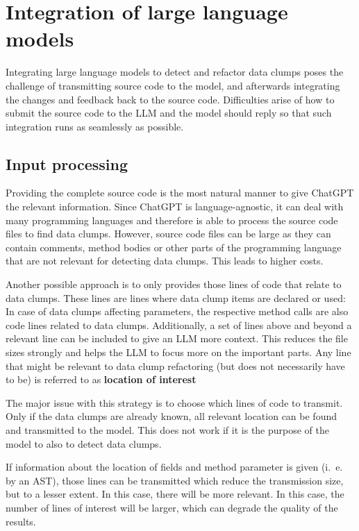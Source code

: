 \section{Integration of large language models}\label{sec:implementation_tools}
Integrating large language models to detect and refactor data clumps poses the challenge of transmitting source code to the model, and afterwards integrating the changes and  feedback back to the source code. Difficulties arise of how to submit the source code to the \ac{LLM} and  the model should reply so that such integration runs as seamlessly as possible. 

\subsection{Input processing}
Providing the complete source code is the most natural manner to give ChatGPT the relevant information. Since ChatGPT is language-agnostic, it can deal with many programming languages and therefore is able to process the source code files to find data clumps. However, source code files can be large as they can contain comments, method bodies or other parts of the programming language that are not relevant for detecting data clumps. This leads to higher costs.

Another possible approach is to only provides those lines of code that relate to data clumps. These lines are lines where data clump items are declared or used: In case of data clumps affecting parameters, the respective method calls are also code lines related to data clumps. Additionally, a set of lines above and beyond a relevant line can be included to give an \ac{LLM} more context. This reduces the file sizes strongly and helps the \ac{LLM} to focus more on the important parts. Any line that might be relevant to data clump refactoring (but does not necessarily have to be) is referred to as \textbf{location of interest}

The major issue with this strategy is to choose which lines of code to transmit. Only if the data clumps are already known, all relevant location can be found and transmitted to the model. This does not work if it is the purpose of the model to also to detect data clumps. 

If information about the location of fields and method parameter is given (i.~e. by an \ac{AST}), those lines can be transmitted which reduce the transmission size, but to a lesser extent. In this case, there will be more relevant. In this case, the number of lines of interest will be larger, which can degrade the quality of the results. 

